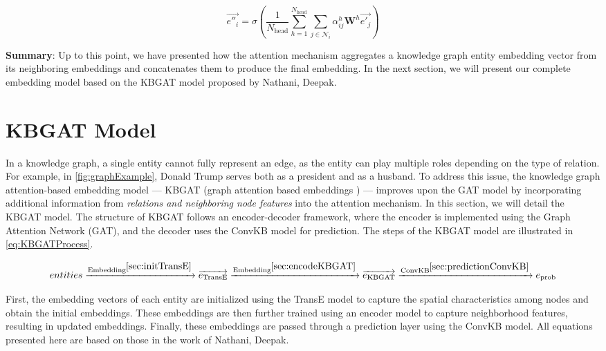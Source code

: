 \begin{equation}
	\label{multiHeadConcat}
	{\overrightarrow{e''_i}}={\sigma\left(\frac{1}{N_{\text{head}}} \sum_{h=1}^{N_{\text{head}}}\sum_{j\in \mathcal{N}_i}\alpha_{ij}^{h} \mathbf{W}^{h} \overrightarrow{e'_{j}} \right)}
\end{equation}



\textbf{Summary}: Up to this point, we have presented how the attention mechanism aggregates a knowledge graph entity embedding vector from its neighboring embeddings and concatenates them to produce the final embedding. In the next section, we will present our complete embedding model based on the KBGAT model proposed by Nathani, Deepak\cite{nathani2019learning}.

\section{KBGAT Model}

In a knowledge graph, a single entity cannot fully represent an edge, as the entity can play multiple roles depending on the type of relation. For example, in \autoref{fig:graphExample}, Donald Trump serves both as a president and as a husband. To address this issue, the knowledge graph attention-based embedding model — KBGAT (graph attention based embeddings \cite{nathani2019learning}) — improves upon the GAT model by incorporating additional information from \textit{relations and neighboring node features} into the attention mechanism. In this section, we will detail the KBGAT model. The structure of KBGAT follows an encoder-decoder framework, where the encoder is implemented using the Graph Attention Network (GAT), and the decoder uses the ConvKB model for prediction. The steps of the KBGAT model are illustrated in \ref{eq:KBGATProcess}.

\begin{equation}
	\label{eq:KBGATProcess}
	entities \xrightarrow{\text{Embedding}^{\ref{sec:initTransE}}} \overrightarrow{e_{\text{TransE}}} \xrightarrow{\text{Embedding} ^{\ref{sec:encodeKBGAT}}} \overrightarrow{e_{\text{KBGAT}}} \xrightarrow{\text{ConvKB}^{\ref{sec:predictionConvKB}}} e_{\text{prob}}
\end{equation}

First, the embedding vectors of each entity are initialized using the TransE model to capture the spatial characteristics among nodes and obtain the initial embeddings. These embeddings are then further trained using an encoder model to capture neighborhood features, resulting in updated embeddings. Finally, these embeddings are passed through a prediction layer using the ConvKB model. All equations presented here are based on those in the work of Nathani, Deepak\cite{nathani2019learning}.




